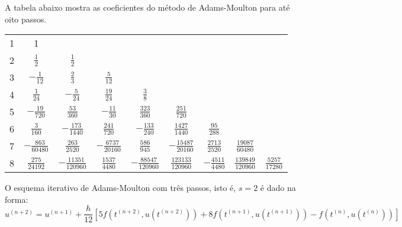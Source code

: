 A tabela abaixo mostra as coeficientes do método de Adams-Moulton para até oito passos. 
 \begin{center}
\begin{tabular}{|c|cccccccc|}
\hline
1 & 1 &&&&&&&\\
2 & $\frac{1}{2}$ & $\frac{1}{2}$&&&&&&\\
3 & $-\frac{1}{12}$&$\frac{2}{3}$&$\frac{5}{12}$&&&&&\\
4 & $\frac{1}{24}$ & $-{\frac {5}{24}}$ & ${\frac {19}{24}}$ & $\frac{3}{8}$ &&&&\\
5 & $-{\frac {19}{720}}$ & ${\frac {53}{360}}$ & $-{\frac {11}{30}}$ & ${\frac {323}{360}}$ & ${\frac {251}{720}}$&&&\\
6 & ${\frac {3}{160}}$ & $-{\frac {173}{1440}}$ & ${\frac {241}{720}}$ & $-{\frac {133}{240}}$ & ${\frac {1427}{1440}}$ & ${\frac {95}{288}}$&&\\
7 & $-{\frac {863}{60480}}$ & ${\frac {263}{2520}}$ & $-{\frac {6737}{20160}}$ & ${\frac {586}{945}}$ & $-{\frac {15487}{20160}}$ & ${\frac {2713}{2520}}$ &${\frac {19087}{60480}}$&\\
8 &$ {\frac {275}{24192}}$ & $-{\frac {11351}{120960}}$&${\frac {1537}{4480}}$&$-{\frac {88547}{120960}}$&${\frac {123133}{120960}}$&$-{\frac {4511}{4480}}$&${\frac {139849}{120960}}$&${\frac {5257}{17280}}$\\
\hline 
\end{tabular}
 \end{center}

\begin{ex} O esquema iterativo de Adams-Moulton com três passos, isto é, $s=2$ é dado na forma:
 \begin{equation*}
  u^{(n+2)}=u^{(n+1)}+\frac{h}{12}\left[5f\left(t^{(n+2)},u(t^{(n+2)})\right)+8f\left(t^{(n+1)},u(t^{(n+1)})\right)-f\left(t^{(n)},u(t^{(n)})\right)\right]
 \end{equation*}
 \end{ex}

 
